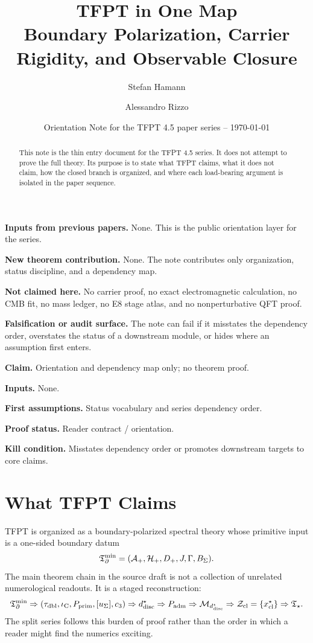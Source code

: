 \documentclass[11pt,a4paper]{article}
\title{\color{tfptblue}\textbf{TFPT in One Map}\\[0.4em]
{\Large Boundary Polarization, Carrier Rigidity, and Observable Closure}}
\author{Stefan Hamann \and Alessandro Rizzo}
\date{{\normalsize\color{tfptgray}\sffamily Orientation Note for the TFPT 4.5 paper series -- \today}}
\begin{document}
\maketitle

\begin{abstract}
This note is the thin entry document for the TFPT 4.5 series. It does not attempt to prove the
full theory. Its purpose is to state what TFPT claims, what it does not claim, how the closed branch
is organized, and where each load-bearing argument is isolated in the paper sequence.
\end{abstract}

\begin{tfptfrontbox}
\textbf{Inputs from previous papers.} None. This is the public orientation layer for the series.

\textbf{New theorem contribution.} None. The note contributes only organization, status discipline,
and a dependency map.

\textbf{Not claimed here.} No carrier proof, no exact electromagnetic calculation, no CMB fit, no
mass ledger, no E8 stage atlas, and no nonperturbative QFT proof.

\textbf{Falsification or audit surface.} The note can fail if it misstates the dependency order,
overstates the status of a downstream module, or hides where an assumption first enters.
\end{tfptfrontbox}


\begin{tfptclaimcontract}
\textbf{Claim.} Orientation and dependency map only; no theorem proof.\par
\textbf{Inputs.} None.\par
\textbf{First assumptions.} Status vocabulary and series dependency order.\par
\textbf{Proof status.} Reader contract / orientation.\par
\textbf{Kill condition.} Misstates dependency order or promotes downstream targets to core claims.\par
\end{tfptclaimcontract}

\tableofcontents

\section{What TFPT Claims}

TFPT is organized as a boundary-polarized spectral theory whose primitive input is a one-sided
boundary datum
\[
\mathfrak T_{\partial}^{\min}=(\mathcal A_+,\mathcal H_+,D_+,J,\Gamma,B_\Sigma).
\]
The main theorem chain in the source draft is not a collection of unrelated numerological
readouts. It is a staged reconstruction:
\[
\mathfrak T_{\partial}^{\min}
\Rightarrow
(\tau_{\mathrm{dbl}},\iota_{\mathrm C},P_{\mathrm{prim}},[u_\Sigma],c_3)
\Rightarrow
d^\star_{\mathrm{disc}}
\Rightarrow
P_{\mathrm{adm}}
\Rightarrow
\mathcal M_{d^\star_{\mathrm{disc}}}
\Rightarrow
\mathcal Z_{\mathrm{cl}}=\{x^\star_{\mathrm{cl}}\}
\Rightarrow
\mathfrak T_{\star} .
\]
The split series follows this burden of proof rather than the order in which a reader might find
the numerics exciting.
\end{document}
